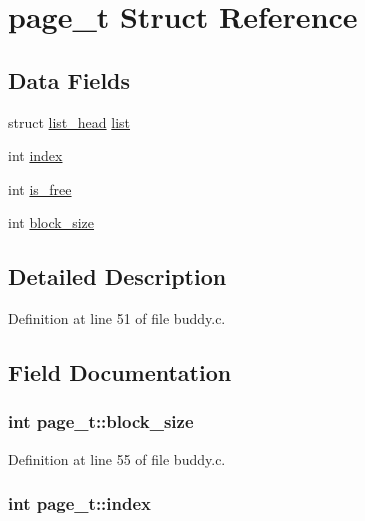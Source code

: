 \hypertarget{structpage__t}{}\section{page\+\_\+t Struct Reference}
\label{structpage__t}
\subsection*{Data Fields}
\begin{DoxyCompactItemize}
\item 
struct \hyperlink{structlist__head}{list\+\_\+head} \hyperlink{structpage__t_a97306c6fff4f6280e8e8049412091475}{list}
\item 
int \hyperlink{structpage__t_a006523076a191dd2fa60e23b2dfa6ef2}{index}
\item 
int \hyperlink{structpage__t_a0f152e52d0a751f6c17df9279b89714d}{is\+\_\+free}
\item 
int \hyperlink{structpage__t_aaf0eb0073b83e45e1e068e49e247985e}{block\+\_\+size}
\end{DoxyCompactItemize}


\subsection{Detailed Description}


Definition at line 51 of file buddy.\+c.



\subsection{Field Documentation}
\subsubsection[{\texorpdfstring{block\+\_\+size}{block_size}}]{\setlength{\rightskip}{0pt plus 5cm}int page\+\_\+t\+::block\+\_\+size}\hypertarget{structpage__t_aaf0eb0073b83e45e1e068e49e247985e}{}\label{structpage__t_aaf0eb0073b83e45e1e068e49e247985e}


Definition at line 55 of file buddy.\+c.

\subsubsection[{\texorpdfstring{index}{index}}]{\setlength{\rightskip}{0pt plus 5cm}int page\+\_\+t\+::index}\hypertarget{structpage__t_a006523076a191dd2fa60e23b2dfa6ef2}{}\label{structpage__t_a006523076a191dd2fa60e23b2dfa6ef2}


